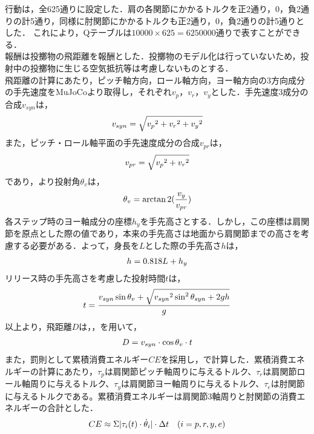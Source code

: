 行動は，全625通りに設定した．肩の各関節にかかるトルクを正2通り，0，負2通りの計5通り，同様に肘関節にかかるトルクも正2通り，0，負2通りの計5通りとした．
これにより，Qテーブルは$10000 \times 625=6250000$通りで表すことができる．\\
報酬は投擲物の飛距離を報酬とした．投擲物のモデル化は行っていないため，投射中の投擲物に生じる空気抵抗等は考慮しないものとする．\\
飛距離の計算にあたり，ピッチ軸方向，ロール軸方向，ヨー軸方向の3方向成分の手先速度をMuJoCoより取得し，それぞれ$v_{p}$，$v_{r}$，$v_{y}$とした．手先速度3成分の合成$v_{syn}$は，
\begin{eqnarray}
  \equlabel{3}
  v_{syn} = \sqrt{{v_{p}}^{2} + {v_{r}}^{2} + {v_{y}}^{2}}
\end{eqnarray}
また，ピッチ・ロール軸平面の手先速度成分の合成$v_{pr}$は，
\begin{eqnarray}
  \equlabel{4}
  v_{pr} = \sqrt{{v_{p}}^{2} + {v_{r}}^{2}}
\end{eqnarray}
であり，より投射角$\theta_{v}$は，
\begin{eqnarray}
  \equlabel{5}
  \theta_{v} = \arctan2(\frac{v_{y}}{v_{pr}})
\end{eqnarray}
各ステップ時のヨー軸成分の座標$h_{y}$を手先高さとする．しかし，この座標は肩関節を原点とした際の値であり，本来の手先高さは地面から肩関節までの高さを考慮する必要がある．よって，身長を$L$とした際の手先高さ$h$は，
\begin{eqnarray}
  \equlabel{6}
  h = 0.818L + h_{y}
\end{eqnarray}
リリース時の手先高さを考慮した投射時間$t$は，
\begin{eqnarray}
  \equlabel{7}
  t = \frac{v_{syn}\sin\theta_{v} + \sqrt{{v_{syn}}^2\sin^2\theta_{syn} + 2gh}}{g}
\end{eqnarray}
以上より，飛距離$D$は，，を用いて，
\begin{eqnarray}
  \equlabel{8}
  D = v_{syn} \cdot \cos\theta_{v} \cdot t
\end{eqnarray}
また，罰則として累積消費エネルギー$CE$を採用し，で計算した．累積消費エネルギーの計算にあたり，$\tau_{p}$は肩関節ピッチ軸周りに与えるトルク、$\tau_{r}$は肩関節ロール軸周りに与えるトルク、$\tau_{y}$は肩関節ヨー軸周りに与えるトルク、$\tau_{e}$は肘関節に与えるトルクである。累積消費エネルギーは肩関節3軸周りと肘関節の消費エネルギーの合計とした．
\begin{eqnarray}
  \equlabel{89}
  CE\approx\Sigma|\tau_{i}(t)\cdot\dot{\theta}_{i}|\cdot\Delta t \quad (i=p, r, y, e)
\end{eqnarray}
